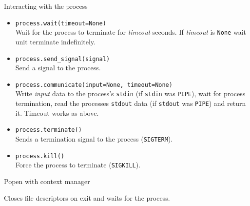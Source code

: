 \begin{frame}{Interacting with the process}

\begin{itemize}
\item
  \texttt{process.wait(timeout=None)}\\
  Wait for the process to terminate for \emph{timeout} seconds. If
  \emph{timeout} is \texttt{None} wait unit terminate indefinitely.
\item
  \texttt{process.send\_signal(signal)}\\
  Send a signal to the process.
\end{itemize}

\end{frame}

\begin{frame}

\begin{itemize}
\tightlist
\item
  \texttt{process.communicate(input=None,\ timeout=None)}\\
  Write \emph{input} data to the process's \texttt{stdin} (if
  \texttt{stdin} was \texttt{PIPE}), wait for process termination, read
  the processes \texttt{stdout} data (if \texttt{stdout} was
  \texttt{PIPE}) and return it. Timeout works as above.
\end{itemize}

\end{frame}

\begin{frame}

\begin{itemize}
\item
  \texttt{process.terminate()}\\
  Sends a termination signal to the process (\texttt{SIGTERM}).
\item
  \texttt{process.kill()}\\
  Force the process to terminate (\texttt{SIGKILL}).
\end{itemize}

\end{frame}

\begin{frame}[fragile]{Popen with context manager}

\begin{Shaded}
\begin{Highlighting}[]
 \NormalTok{subprocess.Popen([}\NormalTok{]) } 
\end{Highlighting}
\end{Shaded}

Closes file descriptors on exit and waits for the process.

\end{frame}

